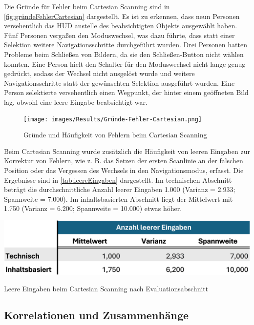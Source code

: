 Die Gründe für Fehler beim Cartesian Scanning sind in \autoref{fig:gründeFehlerCartesian} dargestellt. Es ist zu erkennen, dass neun Personen versehentlich das HUD anstelle des beabsichtigten Objekts ausgewählt haben. Fünf Personen vergaßen den Moduswechsel, was dazu führte, dass statt einer Selektion weitere Navigationsschritte durchgeführt wurden. Drei Personen hatten Probleme beim Schließen von Bildern, da sie den Schließen-Button nicht wählen konnten. Eine Person hielt den Schalter für den Moduswechsel nicht lange genug gedrückt, sodass der Wechsel nicht ausgelöst wurde und weitere Navigationsschritte statt der gewünschten Selektion ausgeführt wurden. Eine Person selektierte versehentlich einen Wegpunkt, der hinter einem geöffneten Bild lag, obwohl eine leere Eingabe beabsichtigt war. 

\begin{figure}[tbh]
    \centering
    \texttt{[image: images/Results/Gründe-Fehler-Cartesian.png]}
    \caption{Gründe und Häufigkeit von Fehlern beim Cartesian Scanning}
    \label{fig:gründeFehlerCartesian}
\end{figure}

Beim Cartesian Scanning wurde zusätzlich die Häufigkeit von leeren Eingaben zur Korrektur von Fehlern, wie z. B. das Setzen der ersten Scanlinie an der falschen Position oder das Vergessen des Wechsels in den Navigationsmodus, erfasst. Die Ergebnisse sind in \autoref{tab:leereEingaben} dargestellt. 
Im technischen Abschnitt beträgt die durchschnittliche Anzahl leerer Eingaben 1.000 (Varianz = 2.933; Spannweite = 7.000). Im inhaltsbasierten Abschnitt liegt der Mittelwert mit 1.750 (Varianz = 6.200; Spannweite = 10.000) etwas höher.

\begin{table}[tbh]
    \centering
    \includegraphics{images/Results/leereEingaben.png}
    \caption{Leere Eingaben beim Cartesian Scanning nach Evaluationsabschnitt}
    \label{tab:leereEingaben}
\end{table}

\subsection{Korrelationen und Zusammenhänge}

